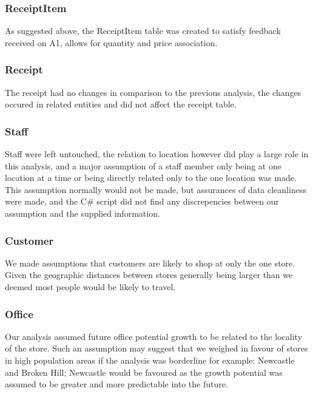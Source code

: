 \documentclass{article}
\begin{document}
            \subsubsection{ReceiptItem}
                As suggested above, the ReceiptItem table was created
                to satisfy feedback received on A1, allows for quantity 
                and price association.

            \subsubsection{Receipt}
                The receipt had no changes in comparison to the previous
                analysis, the changes occured in related entities 
                and did not affect the receipt table.

            \subsubsection{Staff}
                Staff were left untouched, the relation to location 
                however did play a large role in this analysis, and 
                a major assumption of a staff member only being at one 
                location at a time or being directly related only to
                the one location was made.
                \\
                This assumption normally would not be made, but 
                assurances of data cleanliness were made, and the C\#
                script did not find any discrepencies between our assumption and the supplied information.

            \subsubsection{Customer}
                We made assumptions that customers are likely to shop at only the one store. Given the geographic distances
                between stores generally being larger than we deemed 
                most people would be likely to travel.

            \subsubsection{Office}
                Our analysis assumed future office potential growth to be 
                related to the locality of the store. Such an assumption
                may suggest that we weighed in favour of stores in 
                high population areas if the analysis was borderline
                for example: Newcastle and Broken Hill; Newcastle
                would be favoured as the growth potential was assumed to 
                be greater and more predictable into the future.
\end{document}
